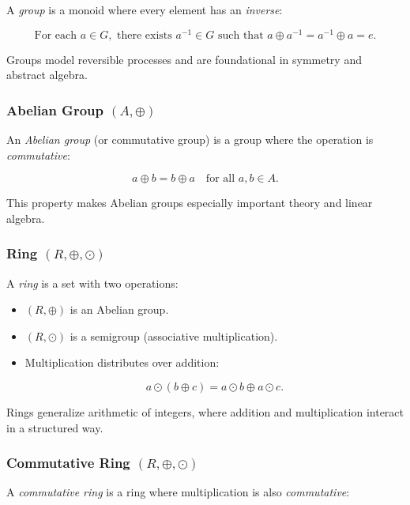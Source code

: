 A \emph{group} is a monoid where every element has an \emph{inverse}:

\[
    \text{For each } a \in G, \text{ there exists } a^{-1} \in G \text{ such that } a \oplus a^{-1} = a^{-1} \oplus a = e.
\]

Groups model reversible processes and are foundational in symmetry and abstract algebra.

\subsubsection{Abelian Group \texorpdfstring{\((A, \oplus)\)}{}}

An \emph{Abelian group} (or commutative group) is a group where the operation is \emph{commutative}:

\[
    a \oplus b = b \oplus a \quad \text{for all } a, b \in A.
\]

This property makes Abelian groups especially important theory and linear algebra.

\subsubsection{Ring \texorpdfstring{\((R, \oplus, \odot)\)}{}}

A \emph{ring} is a set with two operations:

\begin{itemize}

    \item \((R, \oplus)\) is an Abelian group.

    \item \((R, \odot)\) is a semigroup (associative multiplication).
    
    \item Multiplication distributes over addition:
  
    \[
      a \odot (b \oplus c) = a \odot b \oplus a \odot c.
    \]

  \end{itemize}

Rings generalize arithmetic of integers, where addition and multiplication interact in a structured way.

\subsubsection{Commutative Ring \texorpdfstring{\((R, \oplus, \odot)\)}{}}

A \emph{commutative ring} is a ring where multiplication is also \emph{commutative}:

